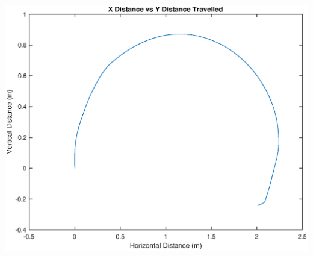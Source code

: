\documentclass[10pt]{article}
\newcommand{\bigScale}{0.6}
\begin{document}
\includegraphics[scale=\bigScale]{./figures/task1_x0point2y2.eps}
\end{document}
